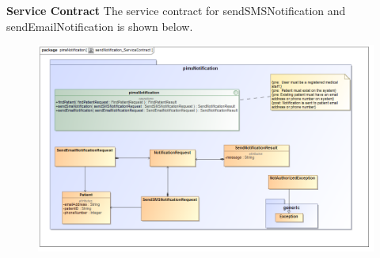 \begin{description}
	\begin{description}
		\item{\textbf{Service Contract}} The service contract for sendSMSNotification and  sendEmailNotification is shown below.
		\begin{figure}[h!]
			\includegraphics[width=\linewidth]{./Graphics/pimsNotification/sendNotificatioServiceContract}
		\end{figure}
	\end{description}		
	
\end{description}